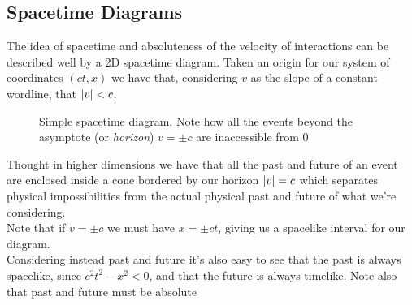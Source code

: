 \documentclass[../admech.tex]{subfiles}
\begin{document}
\subsection{Spacetime Diagrams}
The idea of spacetime and absoluteness of the velocity of interactions can be described well by a 2D spacetime diagram. Taken an origin for our system of coordinates $(ct,x)$ we have that, considering $v$ as the slope of a constant wordline, that $\abs{v}<c$.
\begin{figure}[H]
	\centering
	\caption{Simple spacetime diagram. Note how all the events beyond the asymptote (or \emph{horizon}) $v=\pm c$ are inaccessible from $0$}
	\label{fig:stdiag}
\end{figure}
Thought in higher dimensions we have that all the past and future of an event are enclosed inside a cone bordered by our horizon $\abs{v}=c$ which separates physical impossibilities from the actual physical past and future of what we're considering.\\
Note that if $v=\pm c$ we must have $x=\pm ct$, giving us a spacelike interval for our diagram.\\
Considering instead past and future it's also easy to see that the past is always spacelike, since $c^2t^2-x^2<0$, and that the future is always timelike. Note also that past and future must be absolute
\end{document}
